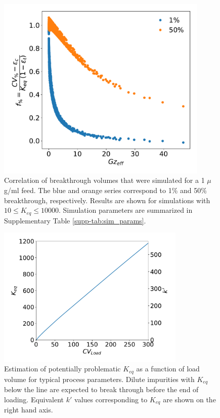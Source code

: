 \documentclass[11pt,a4paper]{article}
\providecommand{\DIFaddtex}[1]{{\sf #1}} %
\providecommand{\DIFaddFL}[1]{\DIFadd{#1}} %
\providecommand{\DIFaddbeginFL}{} %
\providecommand{\DIFaddendFL}{} %
\providecommand{\DIFdelbeginFL}{} %
\providecommand{\DIFdelendFL}{} %
\providecommand{\DIFadd}[1]{\texorpdfstring{\DIFaddtex{#1}}{#1}} %
\begin{document}
\begin{figure}[bp]
    \centering
    \DIFdelbeginFL %
\DIFdelendFL \DIFaddbeginFL \includegraphics[width=0.9\textwidth]{figure_3}
    \DIFaddendFL \caption{Correlation of breakthrough volumes that were simulated for a 1 $\mu$g/ml feed. The blue and orange series correspond to 1\% and 50\% breakthrough, respectively. Results are shown for simulations with $10 \leq K_{eq} \leq 10000$. \DIFaddbeginFL \DIFaddFL{Simulation parameters are summarized in Supplementary Table }\protect\DIFaddFL{\ref{supp-tab:sim_params}.}\DIFaddendFL }
    \label{fig:correlation of breakthrough volumes}
\end{figure}


\begin{figure}[bp]
    \centering
    \DIFdelbeginFL %
\DIFdelendFL \DIFaddbeginFL \includegraphics[width=0.8\textwidth]{figure_4}
    \DIFaddendFL \caption{Estimation of \DIFaddbeginFL \DIFaddFL{potentially }\DIFaddendFL problematic $K_{eq}$ as a function of load volume for typical process parameters. Dilute impurities with $K_{eq}$ below the line are expected to break through before the end of loading. Equivalent $k'$ values corresponding to $K_{eq}$ are shown on the right hand axis.}
    \label{fig:problematic Keq}
\end{figure}
\end{document}
